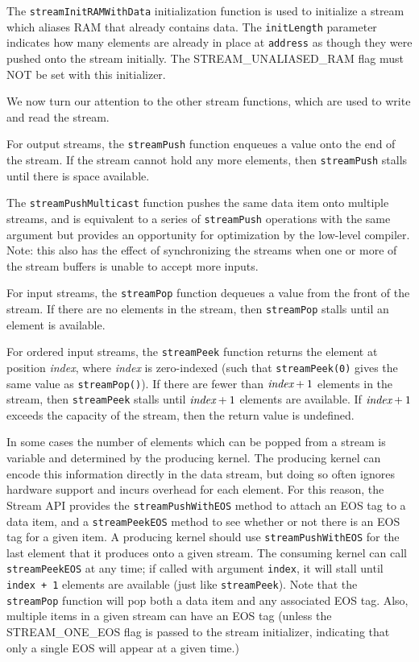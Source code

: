 The {\tt streamInitRAMWithData} initialization function is used to
initialize a stream which aliases RAM that already contains data.  The
{\tt initLength} parameter indicates how many elements are already in
place at {\tt address} as though they were pushed onto the stream
initially. The STREAM\_UNALIASED\_RAM flag must NOT be set with this
initializer.


We now turn our attention to the other stream functions, which are
used to write and read the stream.

 For output streams, the {\tt streamPush} function
enqueues a value onto the end of the stream.  If the stream cannot
hold any more elements, then {\tt streamPush} stalls until there is
space available.

 The {\tt streamPushMulticast} function
pushes the same data item onto multiple streams, and is equivalent to
a series of {\tt streamPush} operations with the same argument but
provides an opportunity for optimization by the low-level compiler.
Note: this also has the effect of synchronizing the streams when one
or more of the stream buffers is unable to accept more inputs.

 For input streams, the {\tt streamPop} function
dequeues a value from the front of the stream.  If there are no
elements in the stream, then {\tt streamPop} stalls until an element
is available.

 For ordered input streams, the {\tt streamPeek}
function returns the element at position {\it index}, where {\it
index} is zero-indexed (such that {\tt streamPeek(0)} gives the same
value as {\tt streamPop()}).  If there are fewer than $\mbox{\it index}+1$
elements in the stream, then {\tt streamPeek} stalls until
$\mbox{\it index}+1$ elements are available. If $\mbox{\it index}+1$ exceeds the
capacity of the stream, then the return value is undefined.

 In some cases the number of elements which can be
popped from a stream is variable and determined by the producing
kernel.  The producing kernel can encode this information directly in
the data stream, but doing so often ignores hardware support and
incurs overhead for each element.  For this reason, the Stream API
provides the {\tt streamPushWithEOS} method to attach an EOS tag to a
data item, and a {\tt streamPeekEOS} method to see whether or not
there is an EOS tag for a given item.  A producing kernel should use
{\tt streamPushWithEOS} for the last element that it produces onto a
given stream.  The consuming kernel can call {\tt streamPeekEOS} at
any time; if called with argument {\tt index}, it will stall until
{\tt index + 1} elements are available (just like {\tt streamPeek}).
Note that the {\tt streamPop} function will pop both a data item and
any associated EOS tag.  Also, multiple items in a given stream can
have an EOS tag (unless the STREAM\_ONE\_EOS flag is passed to the
stream initializer, indicating that only a single EOS will appear at a
given time.)


